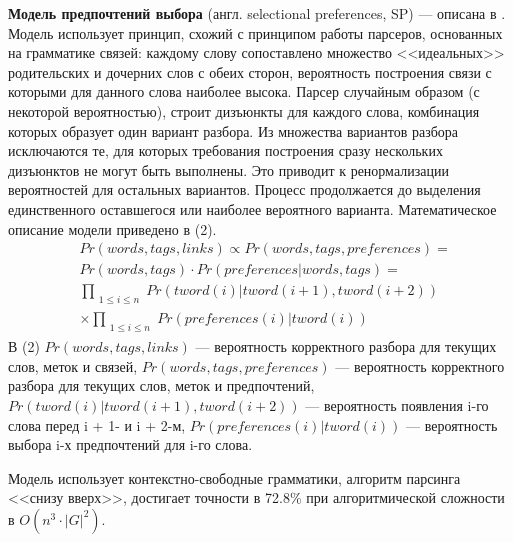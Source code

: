 \textbf{Модель предпочтений выбора} (англ. selectional preferences, SP) --- описана в \cite{eisner}. Модель использует принцип, схожий с принципом работы парсеров, основанных на грамматике связей: каждому слову сопоставлено множество <<идеальных>> родительских и дочерних слов с обеих сторон, вероятность построения связи с которыми для данного слова наиболее высока. Парсер случайным образом (с некоторой вероятностью), строит дизъюнкты для каждого слова, комбинация которых образует один вариант разбора. Из множества вариантов разбора исключаются те, для которых требования построения сразу нескольких дизъюнктов не могут быть выполнены. Это приводит к ренормализации вероятностей для остальных вариантов. Процесс продолжается до выделения единственного оставшегося или наиболее вероятного варианта. Математическое описание модели приведено в (2).
\begin{equation}\begin{split}
	& Pr(words, tags, links) \propto Pr(words, tags, preferences) = \\
	& Pr(words, tags) \cdot Pr(preferences | words, tags) = \\
	& \prod_{\substack{1 \leq i \leq n}} Pr(tword(i) | tword(i + 1), tword(i + 2)) \\
	& \times \prod_{\substack{1 \leq i \leq n}} Pr(preferences(i) | tword(i))
\end{split}\end{equation}
В (2) \(Pr(words, tags, links)\) --- вероятность корректного разбора для текущих слов, меток и связей, \(Pr(words, tags, preferences)\) --- вероятность корректного разбора для текущих слов, меток и предпочтений,\\ \(Pr(tword(i) | tword(i + 1), tword(i + 2))\) --- вероятность появления i-го слова перед i + 1- и i + 2-м, \(Pr(preferences(i) | tword(i))\) --- вероятность выбора i-х предпочтений для i-го слова.

Модель использует контекстно-свободные грамматики, алгоритм парсинга <<снизу вверх>>, достигает точности в 72.8\% при алгоритмической сложности в \(O(n^3 \cdot |G|^2)\).

